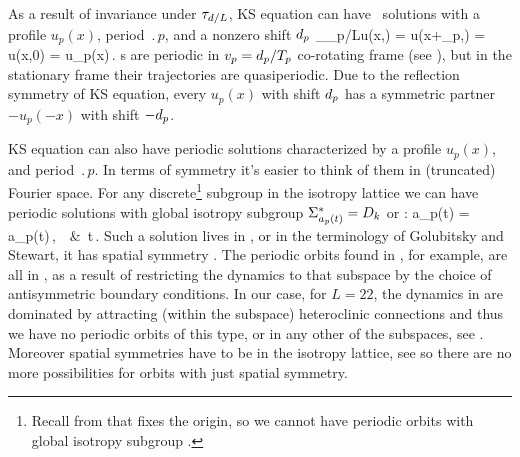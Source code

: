 As a result of invariance under $\tau_{d/L}$,
KS equation can have \rpo\ solutions
with a profile $u_p(x)$, period $\period{p}$, and a
nonzero shift $d_p$
\beq
  \Shift_{\shift_p/L}u(x,) =
  u(x+\shift_p,) = u(x,0) = u_p(x)\,.
\label{KSrpos}
\eeq
{\Rpo s}  are periodic in
$v_p=d_p/{T_{p}}$ co-rotating frame (see
), but in the stationary frame their
trajectories are quasiperiodic.  Due to the reflection symmetry
 of KS equation, every {\rpo} $u_p(x)$ with shift
$d_p$ has a symmetric partner $-u_p(-x)$ with shift $-d_p$.


KS equation can also have periodic solutions
characterized by a profile $u_p(x)$,
and period $\period{p}$. In terms of symmetry it's easier to think of them
in (truncated) Fourier space. For any discrete\footnote{Recall from that  fixes the origin, so
we cannot have periodic orbits with global isotropy subgroup .} subgroup in the isotropy lattice
we can have periodic solutions with global isotropy subgroup $\Sigma^*_{a_p(t)}=D_{k}$ or :
\beq
  \gamma a_p(t) = a_p(t)\,, \qquad \forall \gamma\in{}\,\ \&\ \forall t\in[0,\period{p}]\,.
\eeq
Such a solution lives in , or in the terminology of Golubitsky and Stewart,
it has spatial symmetry . The periodic orbits found in , for example,
are all in , as a result of restricting the dynamics to that subspace by the choice of antisymmetric
boundary conditions. In our case, for $L=22$, the dynamics in  are dominated by attracting (within
the subspace) heteroclinic connections and thus we have no periodic orbits of this type, or in
any other of the  subspaces, see . Moreover spatial symmetries have to
be in the isotropy lattice, see \cite[Chapter 3]{golubitsky2002sp} so there are no more possibilities
for orbits with just spatial symmetry.


